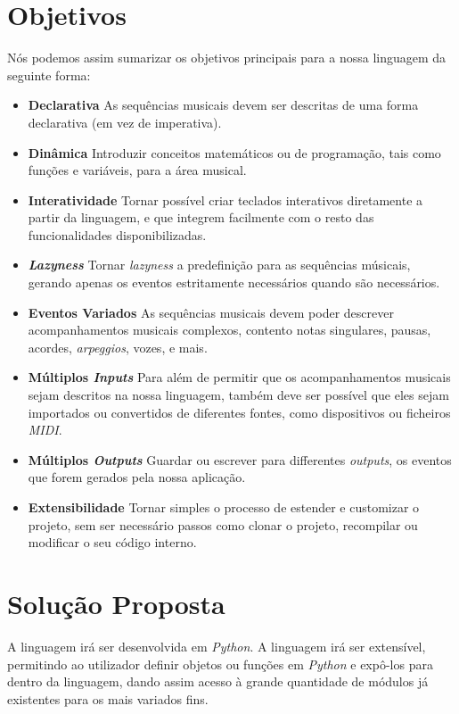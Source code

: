 \section{Objetivos}
Nós podemos assim sumarizar os objetivos principais para a nossa linguagem da seguinte forma:
\begin{itemize}
 \item \textbf{Declarativa} As sequências musicais devem ser descritas de uma forma declarativa (em vez de imperativa).
 \item \textbf{Dinâmica} Introduzir conceitos matemáticos ou de programação, tais como funções e variáveis, para a área musical.
 \item \textbf{Interatividade} Tornar possível criar teclados interativos diretamente a partir da linguagem, e que integrem facilmente com o resto  das funcionalidades  disponibilizadas.
 \item \textbf{\textit{Lazyness}} Tornar \textit{lazyness} a predefinição para as sequências músicais, gerando apenas os eventos estritamente necessários quando são necessários.
 \item \textbf{Eventos Variados} As sequências musicais devem poder descrever acompanhamentos musicais complexos, contento notas singulares, pausas, acordes, \textit{arpeggios}, vozes, e mais.
 \item \textbf{Múltiplos \textit{Inputs}} Para além de permitir que os acompanhamentos musicais sejam descritos na nossa linguagem, também deve ser possível que eles sejam importados ou convertidos de diferentes fontes, como dispositivos ou ficheiros \textit{MIDI}.
 \item \textbf{Múltiplos \textit{Outputs}} Guardar ou escrever para differentes \textit{outputs}, os eventos que forem gerados pela nossa aplicação.
 \item \textbf{Extensibilidade} Tornar simples o processo de estender e customizar o projeto, sem ser necessário passos como clonar o projeto, recompilar ou modificar o seu código interno.
\end{itemize}

\section{Solução Proposta}
A linguagem irá ser desenvolvida em \textit{Python}. A linguagem irá ser extensível, permitindo ao utilizador definir objetos ou funções em \textit{Python} e expô-los para dentro da linguagem, dando assim acesso à grande quantidade de módulos já existentes para os mais variados fins.

